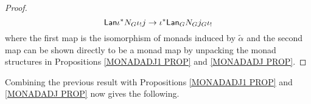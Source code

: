 \documentclass[a4paper,10pt]{article}%
\begin{document}
\begin{proof}
\[	\mathsf{Lan} \iota^{\**} N_G \iota_! j  \to
	\iota^{\**} \mathsf{Lan}_G  N_G  j_G \iota_!
\]
where the first map is the isomorphism of monads induced by $\tilde{\alpha}$ and the second map can be shown directly to be a monad map by unpacking the monad structures in 
Propositions \ref{MONADADJ1 PROP} and \ref{MONADADJ PROP}.
\end{proof}

Combining the previous result with
Propositions \ref{MONADADJ1 PROP} and \ref{MONADADJ PROP} now gives the following.
\end{document}
